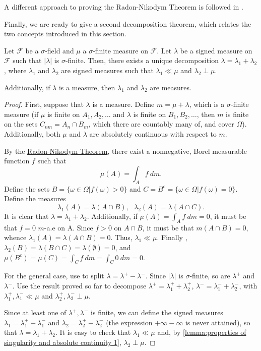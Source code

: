 A different approach to proving the Radon-Nikodym Theorem is followed in \cite{kolmogorov1957elements}.

Finally, we are ready to give a second decomposition theorem, which relates the two concepts introduced in this section.

\begin{thrm}\label{theorem:Lebesgue Decomposition}
  Let \(\mathcal{F}\) be a \(\sigma\)-field and \(\mu\) a \(\sigma\)-finite measure on \(\mathcal{F}\). Let \(\lambda\) be a signed measure on \(\mathcal{F}\) such that \(|\lambda|\) is \(\sigma\)-finite. Then, there exists a unique decomposition \(\lambda=\lambda_{1}+\lambda_{2}\), where \(\lambda_{1}\) and \(\lambda_{2}\) are signed measures such that \(\lambda_{1}\ll\mu\) and \(\lambda_{2}\perp\mu\).

  Additionally, if \(\lambda\) is a measure, then \(\lambda_{1}\) and \(\lambda_{2}\) are measures.
\end{thrm}
\begin{proof}
First, suppose that \(\lambda\) is a measure. Define \(m=\mu+\lambda\), which is a \(\sigma\)-finite measure (if \(\mu\) is finite on \(A_{1},A_{2},\dotsc\) and \(\lambda\) is finite on \(B_{1},B_{2},\dotsc\), then \(m\) is finite on the sets \(C_{nm}=A_{n}\cap B_{m}\), which there are countably many of, and cover \(\Omega\)). Additionally, both \(\mu\) and \(\lambda\) are absolutely continuous with respect to \(m\).

By the \href{theorem:Radon-Nikodym}{Radon-Nikodym Theorem}, there exist a nonnegative, Borel measurable function \(f\) such that
\[\mu(A)=\int_{A}f~dm.\]
Define the sets \(B=\{\omega\in\Omega|f(\omega)>0\}\) and \(C=B^{c}=\{\omega\in\Omega|f(\omega)=0\}\). Define the measures
\[\lambda_{1}(A)=\lambda(A\cap B), ~~~\lambda_{2}(A)=\lambda(A\cap C).\]
It is clear that \(\lambda=\lambda_{1}+\lambda_{2}\). Additionally, if \(\mu(A)=\int_Af~dm=
0\), it must be that \(f=0\) \(m\)-a.e on A. Since \(f>0\) on \(A\cap B\), it must be that \(m(A\cap B)=0\), whence \(\lambda_{1}(A)=\lambda(A\cap B)=0\). Thus, \(\lambda_{1}\ll\mu\).
Finally , \(\lambda_{2}(B)=\lambda(B\cap C)=\lambda(\emptyset)=0\), and \(\mu(B^{c})=\mu(C)=\int_Cf~dm=\int_C0~dm=0\).

For the general case, use  to split \(\lambda=\lambda^{+}-\lambda^{-}\). Since \(|\lambda|\) is \(\sigma\)-finite, so are \(\lambda^{+}\) and \(\lambda^{-}\). Use the result proved so far to decompose \(\lambda^{+}=\lambda_{1}^{+}+\lambda_{2}^{+}\), \(\lambda^-=\lambda_1^-+\lambda_2^-\), with \(\lambda_{1}^{+}, \lambda_{1}^{-}\ll\mu\) and \(\lambda_{2}^{+},\lambda_{2}^{-}\perp\mu\).

Since at least one of \(\lambda^{+}, \lambda^{-}\) is finite, we can define the signed measures \(\lambda_{1}=\lambda_{1}^{+}-\lambda_{1}^{-}\) and
\(\lambda_{2}=\lambda_{2}^{+}-\lambda_{2}^{-}\) (the expression \(+\infty-\infty\) is never attained), so that \(\lambda=\lambda_{1}+\lambda_{2}\). It is easy to check that \(\lambda_{1}\ll\mu\) and, by \cref{lemma:properties of singularity and absolute continuity 1}, \(\lambda_{2}\perp\mu\).
\end{proof}
